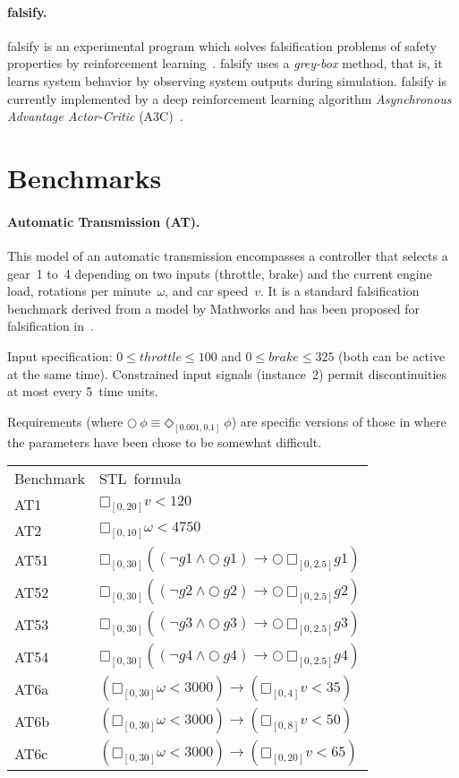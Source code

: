 \documentclass[a4paper]{easychair}
\newcommand{\falsify}{falsify\xspace}
\begin{document}
	\paragraph{\falsify.}
	\falsify is an experimental program which solves falsification
    problems of safety properties by reinforcement
    learning~\cite{DBLP:conf/fm/AkazakiLYDH18}.  \falsify uses a
    \emph{grey-box} method, that is, it learns system behavior by
    observing system outputs during simulation.  \falsify is currently
    implemented by a deep reinforcement learning algorithm
    \emph{Asynchronous Advantage Actor-Critic}
    (A3C)~\cite{DBLP:conf/icml/MnihBMGLHSK16}.

	\section{Benchmarks}
	\label{sec:benchmarks}

	\paragraph{Automatic Transmission (AT).}

	This model of an automatic transmission encompasses a controller
    that selects a gear~1 to~4 depending on two inputs (throttle,
    brake) and the current engine load, rotations per minute~$\omega$,
    and car speed~$v$.  It is a standard falsification benchmark
    derived from a model by Mathworks and has been proposed for
    falsification in~\cite{ARCH14}.

	Input specification: $0 \le \mathit{throttle} \le 100$ and
    $0 \le \mathit{brake} \le 325$ (both can be active at the same
    time).  Constrained input signals (instance~2) permit
    discontinuities at most every 5~time units.

	Requirements (where $○~\phi \equiv ◇_{[0.001, 0.1]}~\phi$) are specific versions of those in \cite{ARCH14} where the parameters have been chose to be somewhat difficult. \\

	\begin{tabular}{ll}
		\toprule
		Benchmark & STL~formula \\
		\cmidrule(r){1-1} \cmidrule(l){2-2}
		AT1  & $□_{[0, 20]} v < 120$ \\
		AT2  & $□_{[0, 10]} \omega < 4750$ \\
		AT51 & $□_{[0, 30]} ((\lnot g1 \land ○~g1) \to ○~□_{[0, 2.5]} g1)$ \\
		AT52 & $□_{[0, 30]} ((\lnot g2 \land ○~g2) \to ○~□_{[0, 2.5]} g2)$ \\
		AT53 & $□_{[0, 30]} ((\lnot g3 \land ○~g3) \to ○~□_{[0, 2.5]} g3)$ \\
		AT54 & $□_{[0, 30]} ((\lnot g4 \land ○~g4) \to ○~□_{[0, 2.5]} g4)$ \\
		AT6a & $(□_{[0, 30]} \omega < 3000) \to (□_{[0,  4]} v < 35)$ \\
		AT6b & $(□_{[0, 30]} \omega < 3000) \to (□_{[0,  8]} v < 50)$ \\
		AT6c & $(□_{[0, 30]} \omega < 3000) \to (□_{[0, 20]} v < 65)$ \\
		\bottomrule
	\end{tabular}
\end{document}
